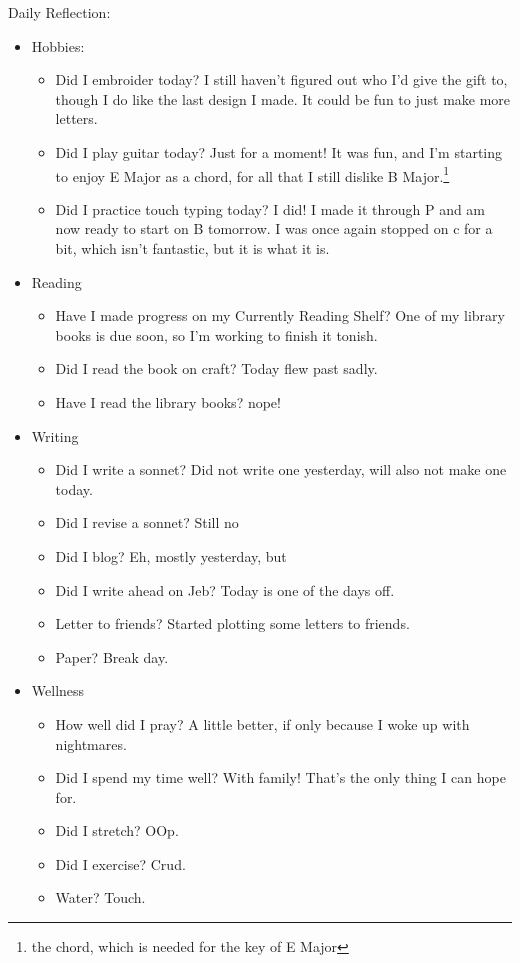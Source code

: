 \documentclass[12pt]{article}[titlepage]
\newcommand{\1}{\={a}}
\newcommand{\2}{\={e}}
\newcommand{\3}{\={\i}}
\newcommand{\4}{\=o}
\newcommand{\5}{\=u}
\newcommand{\6}{\={A}}
\renewcommand{\,}{\textsuperscript{,}}
\begin{document}
Daily Reflection:
\begin{itemize}
\item Hobbies:
\begin{itemize}
\item Did I embroider today? I still haven't figured out who I'd give the gift to, though I do like the last design I made. It could be fun to just make more letters.
\item Did I play guitar today? Just for a moment! It was fun, and I'm starting to enjoy E Major as a chord, for all that I still dislike B Major.\footnote{the chord, which is needed for the key of E Major}
\item Did I practice touch typing today? I did! I made it through P and am now ready to start on B tomorrow. I was once again stopped on c for a bit, which isn't fantastic, but it is what it is.
\end{itemize}
\item Reading
\begin{itemize}
\item Have I made progress on my Currently Reading Shelf? One of my library books is due soon, so I'm working to finish it tonish.
\item Did I read the book on craft? Today flew past sadly.
\item Have I read the library books? nope!
\end{itemize}
\item Writing
\begin{itemize}
\item Did I write a sonnet? Did not write one yesterday, will also not make one today.
\item Did I revise a sonnet? Still no
\item Did I blog? Eh, mostly yesterday, but
\item Did I write ahead on Jeb? Today is one of the days off.
\item Letter to friends? Started plotting some letters to friends.
\item Paper? Break day.
\end{itemize}
\item Wellness
\begin{itemize}
\item How well did I pray? A little better, if only because I woke up with nightmares.
\item Did I spend my time well? With family! That's the only thing I can hope for.
\item Did I stretch? OOp.
\item Did I exercise? Crud.
\item Water? Touch.
\end{itemize}
\end{itemize}
\end{document}
